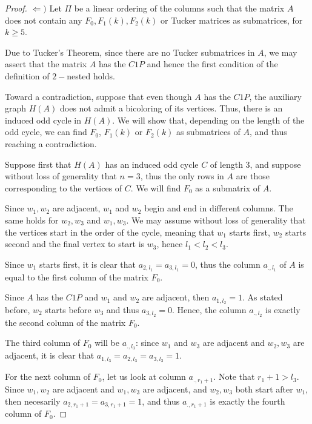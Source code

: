 \documentclass[a4paper,10pt]{report}
\theoremstyle{plain}
\theoremstyle{remark}
\theoremstyle{plain}
\begin{document}
\begin{proof}
	$ \Leftarrow )$ Let $\Pi$ be a linear ordering of the columns such that the matrix $A$ does not contain any $F_0, F_1(k), F_2(k)$ or Tucker matrices as submatrices, for $k\geq 5$.
	
	Due to Tucker's Theorem, since there are no Tucker submatrices in $A$, we may assert that the matrix $A$ has the $C1P$ 
	and hence the first condition of the definition of $2-$nested holds.
	
	\vspace{.5mm}
	Toward a contradiction, suppose that even though $A$ has the $C1P$, the auxiliary graph $H(A)$ does not admit a bicoloring of its vertices.
	Thus, there is an induced odd cycle in $H(A)$. We will show that, depending on the length of the odd cycle, 
	we can find $F_0$, $F_1(k)$ or $F_2(k)$ as submatrices of $A$, and thus reaching a contradiction.

	\vspace{1mm}
	Suppose first that $H(A)$ has an induced odd cycle $C$ of length 3, and suppose without loss of generality that $n = 3$, thus
	the only rows in $A$ are those corresponding to the vertices of $C$.
	We will find $F_0$ as a submatrix of $A$.
	
	Since $w_1, w_2$ are adjacent, $w_1$ and $w_2$ begin and end in different columns. The same holds
	for $w_2, w_3$ and $w_1, w_3$. We may assume without loss of generality that the vertices start in the order of the cycle, 
	meaning that $w_1$ starts first, $w_2$ starts second and the final vertex to start is $w_3$, 
	hence $l_1 < l_2 < l_3$. 
	
	Since $w_1$ starts first, it is clear that $a_{2, l_1} = a_{3,l_1} = 0$, thus the column $a_{.,l_1}$ of $A$ 
	is equal to the first column of the matrix $F_0$.

	Since $A$ has the $C1P$ and $w_1$ and $w_2$ are adjacent, then $a_{1, l_2} = 1$. 
	As stated before, $w_2$ starts before $w_3$ and thus $a_{3,l_2} = 0$. Hence, the column $a_{.,l_2}$ is exactly the second column of the matrix $F_0$.
	
	The third column of $F_0$ will be $a_{., l_3}$: since $w_1$ and $w_3$ are adjacent and $w_2, w_3$ are adjacent, 
	it is clear that $a_{1, l_3} = a_{2, l_3} = a_{3, l_3} = 1$.
	
	For the next column of $F_0$, let us look at column $a_{.,r_1+1}$. Note that $r_1 + 1 > l_3$. Since $w_1, w_2$ are adjacent and $w_1, w_3$ are adjacent, 
	and $w_2, w_3$ both start after $w_1$, then necesarily $a_{2, r_1+1} = a_{3, r_1+1} = 1$, and thus $a_{., r_1+1}$ is exactly the fourth column of $F_0$.
	

\end{proof}
\end{document}
